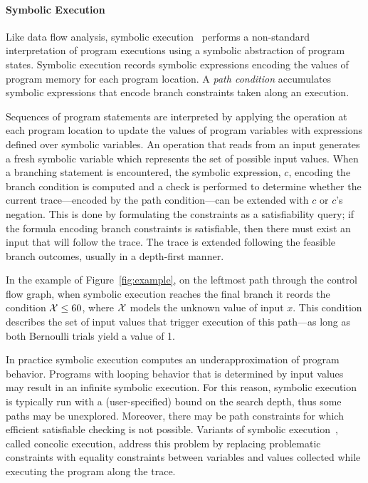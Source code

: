 \paragraph{Symbolic Execution}
Like data flow analysis, symbolic execution~\cite{king1976symbolic,clarke1976system} 
performs a non-standard interpretation of program executions using 
a symbolic abstraction of program states.
Symbolic execution records symbolic expressions encoding the
values of program memory for each program location.  
A \textit{path condition}
accumulates symbolic expressions that encode branch constraints 
taken along an execution.

Sequences of program statements are interpreted by applying the operation
at each program location to update the values of program
variables with expressions defined over symbolic variables.
An operation that reads from an input generates a fresh symbolic
variable which represents the set of possible input values.
When a branching statement is encountered, the symbolic expression, $c$, 
encoding the branch condition is computed and a check is performed
to determine whether the current trace---encoded by the path condition---can be
extended with $c$ or $c$'s negation.  
This is done by formulating the constraints
as a satisfiability query; if the formula encoding branch constraints
is satisfiable, then there must exist an input that will follow the trace.
The trace is extended following the feasible branch outcomes, usually
in a depth-first manner.

In the example of Figure~\ref{fig:example}, on the leftmost path through
the control flow graph, when symbolic execution reaches the 
final branch it reords the condition ${\cal X} \le 60$, where
${\cal X}$ models the unknown value of input $x$.  This condition describes the
set of input values that trigger execution of this path---as long
as both Bernoulli trials yield a value of 1.

In practice symbolic execution computes an underapproximation of 
program behavior.
Programs with looping behavior that is determined by input values 
may result in an infinite symbolic execution.
For this reason, symbolic execution is
typically run with a (user-specified) bound on the search depth, thus
some paths may be unexplored.   Moreover, there may be path constraints
for which efficient satisfiable checking is not possible.  Variants of
symbolic execution~\cite{godefroid2005dart,sen2005cute,song2008bitblaze},
called concolic execution, address this problem by replacing problematic 
constraints with equality constraints between variables 
and values collected while executing the program along the trace.

